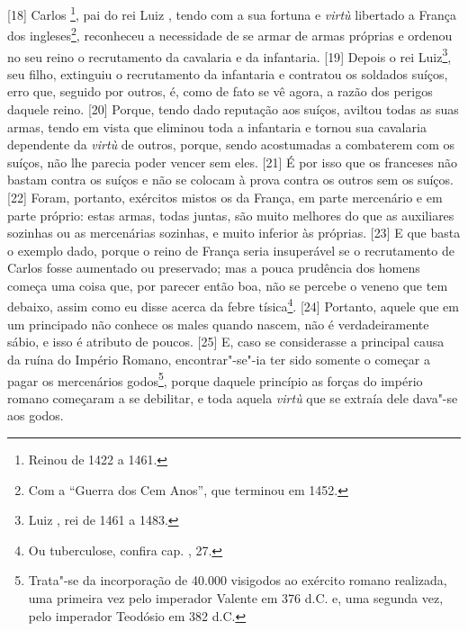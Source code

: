 {[}18{]} Carlos \footnote{Reinou de 1422 a 1461.}, pai do rei Luiz
, tendo com a sua fortuna e \emph{virtù} libertado a França dos
ingleses\footnote{Com a ``Guerra dos Cem Anos'', que terminou em 1452.},
reconheceu a necessidade de se armar de armas próprias e ordenou no seu
reino o recrutamento da cavalaria e da infantaria. {[}19{]} Depois o rei
Luiz\footnote{Luiz , rei de 1461 a 1483.}, seu filho, extinguiu o
recrutamento da infantaria e contratou os soldados suíços, erro que,
seguido por outros, é, como de fato se vê agora, a razão dos perigos
daquele reino. {[}20{]} Porque, tendo dado reputação aos suíços, aviltou
todas as suas armas, tendo em vista que eliminou toda a infantaria e
tornou sua cavalaria dependente da \emph{virtù} de outros, porque, sendo
acostumadas a combaterem com os suíços, não lhe parecia poder vencer sem
eles. {[}21{]} É por isso que os franceses não bastam contra os suíços e
não se colocam à prova contra os outros sem os suíços. {[}22{]} Foram,
portanto, exércitos mistos os da França, em parte mercenário e em parte
próprio: estas armas, todas juntas, são muito melhores do que as
auxiliares sozinhas ou as mercenárias sozinhas, e muito inferior às
próprias. {[}23{]} E que basta o exemplo dado, porque o reino de França
seria insuperável se o recrutamento de Carlos fosse aumentado ou
preservado; mas a pouca prudência dos homens começa uma coisa que, por
parecer então boa, não se percebe o veneno que tem debaixo, assim como
eu disse acerca da febre tísica\footnote{Ou tuberculose, confira cap.
  , 27.}. {[}24{]} Portanto, aquele que em um principado não conhece
os males quando nascem, não é verdadeiramente sábio, e isso é atributo
de poucos. {[}25{]} E, caso se considerasse a principal causa da ruína
do Império Romano, encontrar"-se"-ia ter sido somente o começar a pagar os
mercenários godos\footnote{Trata"-se da incorporação de 40.000 visigodos
  ao exército romano realizada, uma primeira vez pelo imperador Valente
  em 376 d.C. e, uma segunda vez, pelo imperador Teodósio em 382 d.C.},
porque daquele princípio as forças do império romano começaram a se
debilitar, e toda aquela \emph{virtù} que se extraía dele dava"-se aos
godos.

